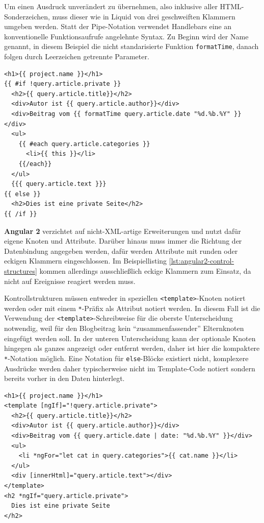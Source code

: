 Um einen Ausdruck unverändert zu übernehmen, also inklusive aller HTML-Sonderzeichen, muss dieser wie in Liquid von drei geschweiften Klammern umgeben werden. Statt der Pipe-Notation verwendet Handlebars eine an konventionelle Funktionsaufrufe angelehnte Syntax. Zu Beginn wird der Name genannt, in diesem Beispiel die nicht standarisierte Funktion \texttt{formatTime}, danach folgen durch Leerzeichen getrennte Parameter.

\begin{lstlisting}[float=h,caption={Blogartikel mit Handlebars}, label={lst:handlebars-control-structures}]
<h1>{{ project.name }}</h1>
{{ #if !query.article.private }}
  <h2>{{ query.article.title}}</h2>
  <div>Autor ist {{ query.article.author}}</div>
  <div>Beitrag vom {{ formatTime query.article.date "%d.%b.%Y" }}</div>
  <ul>
    {{ #each query.article.categories }}
      <li>{{ this }}</li>
    {{/each}}
  </ul>
  {{{ query.article.text }}}
{{ else }}
  <h2>Dies ist eine private Seite</h2>
{{ /if }}
\end{lstlisting}

\textbf{Angular 2} verzichtet auf nicht-XML-artige Erweiterungen und nutzt dafür eigene Knoten und Attribute. Darüber hinaus muss immer die Richtung der Datenbindung angegeben werden, dafür werden Attribute mit runden oder eckigen Klammern eingeschlossen. Im Beispiellisting \ref{lst:angular2-control-structures} kommen allerdings ausschließlich eckige Klammern zum Einsatz, da nicht auf Ereignisse reagiert werden muss.

Kontrollstrukturen müssen entweder in speziellen \texttt{<template>}-Knoten notiert werden oder mit einem \texttt{*}-Präfix als Attribut notiert werden. In diesem Fall ist die Verwendung der \texttt{<template>}-Schreibweise für die oberste Unterscheidung notwendig, weil für den Blogbeitrag kein "`zusammenfassender"' Elternknoten eingefügt werden soll. In der unteren Unterscheidung kann der optionale Knoten hingegen als ganzes angezeigt oder entfernt werden, daher ist hier die kompaktere \texttt{*}-Notation möglich. Eine Notation für \texttt{else}-Blöcke existiert nicht, komplexere Ausdrücke werden daher typischerweise nicht im Template-Code notiert sondern bereits vorher in den Daten hinterlegt.

\begin{lstlisting}[float=h,caption={Blogartikel mit Angular 2}, label={lst:angular2-control-structures}]
<h1>{{ project.name }}</h1>
<template [ngIf]="!query.article.private">
  <h2>{{ query.article.title}}</h2>
  <div>Autor ist {{ query.article.author}}</div>
  <div>Beitrag vom {{ query.article.date | date: "%d.%b.%Y" }}</div>
  <ul>
    <li *ngFor="let cat in query.categories">{{ cat.name }}</li>
  </ul>
  <div [innerHtml]="query.article.text"></div>
</template>
<h2 *ngIf="query.article.private">
  Dies ist eine private Seite
</h2>
\end{lstlisting}


